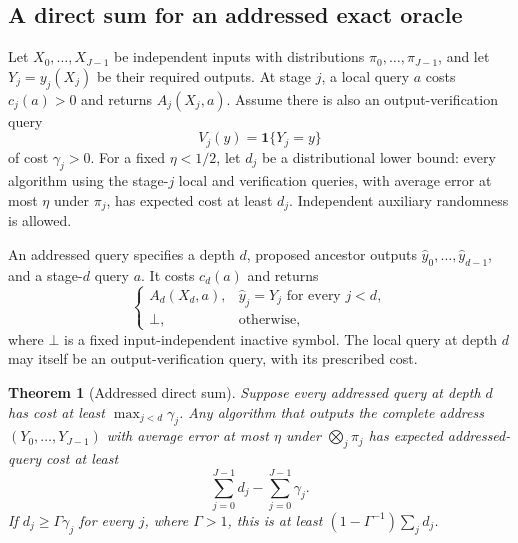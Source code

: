\documentclass[11pt,a4paper]{article}
\newcommand{\one}{\mathbf 1}
\newtheorem{theorem}{Theorem}[section]
\theoremstyle{definition}
\theoremstyle{remark}
\begin{document}
\subsection{A direct sum for an addressed exact oracle}

Let $X_0,\ldots,X_{J-1}$ be independent inputs with distributions
$\pi_0,\ldots,\pi_{J-1}$, and let $Y_j=y_j(X_j)$ be their required outputs.
At stage $j$, a local query $a$ costs $c_j(a)>0$ and returns $A_j(X_j,a)$.
Assume there is also an output-verification query
\[
 V_j(y)=\one\{Y_j=y\}
\]
of cost $\gamma_j>0$.  For a fixed $\eta<1/2$, let $d_j$ be a distributional
lower bound: every algorithm using the stage-$j$ local and verification
queries, with average error at most $\eta$ under $\pi_j$, has expected cost
at least $d_j$.  Independent auxiliary randomness is allowed.

An addressed query specifies a depth $d$, proposed ancestor outputs
$\widehat y_0,\ldots,\widehat y_{d-1}$, and a stage-$d$ query $a$.
It costs $c_d(a)$ and returns
\begin{equation}
 \begin{cases}
  A_d(X_d,a),&\widehat y_j=Y_j\text{ for every }j<d,\\
  \bot,&\text{otherwise},
 \end{cases}
 \label{eq:addressed-oracle}
\end{equation}
where $\bot$ is a fixed input-independent inactive symbol.  The local query
at depth $d$ may itself be an output-verification query, with its prescribed
cost.

\begin{theorem}[Addressed direct sum]
\label{thm:direct-sum}
Suppose every addressed query at depth $d$ has cost at least
$\max_{j<d}\gamma_j$.  Any algorithm that outputs the complete address
$(Y_0,\ldots,Y_{J-1})$ with average error at most $\eta$ under
$\bigotimes_j\pi_j$ has expected addressed-query cost at least
\begin{equation}
 \sum_{j=0}^{J-1}d_j-\sum_{j=0}^{J-1}\gamma_j.
 \label{eq:addressed-direct-sum}
\end{equation}
If $d_j\ge\Gamma\gamma_j$ for every $j$, where $\Gamma>1$, this is at least
$(1-\Gamma^{-1})\sum_jd_j$.
\end{theorem}
\end{document}
